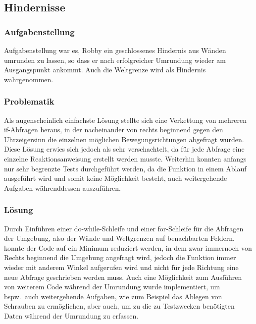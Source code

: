 \subsection{Hindernisse}

\subsubsection*{Aufgabenstellung}
Aufgabenstellung war es, Robby ein geschlossenes Hindernis aus Wänden umrunden zu lassen, so dass er nach erfolgreicher Umrundung wieder am Ausgangspunkt ankommt. Auch die Weltgrenze wird als Hindernis wahrgenommen. 

\subsubsection*{Problematik}
Als augenscheinlich einfachste Lösung stellte sich eine Verkettung von mehreren if-Abfragen heraus, in der nacheinander von rechts beginnend gegen den Uhrzeigersinn die einzelnen möglichen Bewegungsrichtungen abgefragt wurden. Diese Lösung erwies sich jedoch als sehr verschachtelt, da für jede Abfrage eine einzelne Reaktionsanweisung erstellt werden musste.
Weiterhin konnten anfangs nur sehr begrenzte Tests durchgeführt werden, da die Funktion in einem Ablauf ausgeführt wird und somit keine Möglichkeit besteht, auch weitergehende Aufgaben währenddessen auszuführen.


\subsubsection*{Lösung}
Durch Einführen einer do-while-Schleife und einer for-Schleife für die Abfragen der Umgebung, also der Wände und Weltgrenzen auf benachbarten Feldern, konnte der Code auf ein Minimum reduziert werden, in dem  zwar immernoch von Rechts beginnend die Umgebung angefragt wird, jedoch die Funktion immer wieder mit anderem Winkel aufgerufen wird und nicht für jede Richtung eine neue Abfrage geschrieben werden muss.
Auch eine Möglichkeit zum Ausführen von weiterem Code während der Umrundung wurde implementiert, um bspw.\ auch weitergehende Aufgaben, wie zum Beispiel das Ablegen von Schrauben zu ermöglichen, aber auch, um zu die zu Testzwecken benötigten Daten während der Umrundung zu erfassen.

